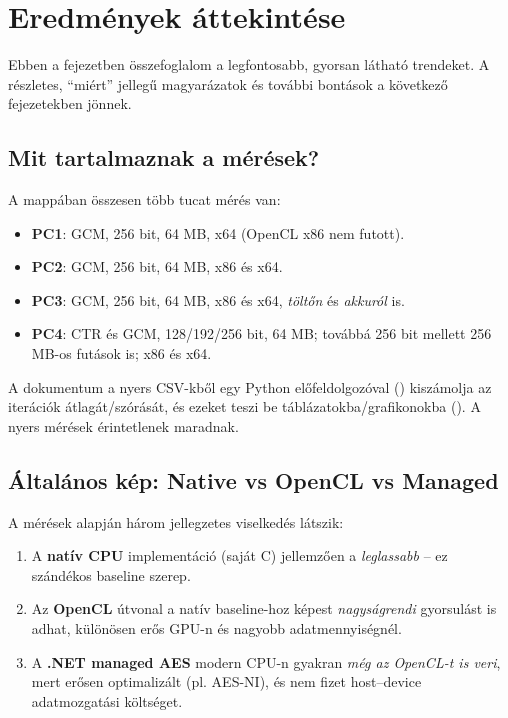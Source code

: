 \chapter{Eredmények áttekintése}

Ebben a fejezetben összefoglalom a legfontosabb, gyorsan látható trendeket.
A részletes, ``miért'' jellegű magyarázatok és további bontások a következő fejezetekben jönnek.

\section{Mit tartalmaznak a mérések?}

A  mappában összesen több tucat mérés van:

\begin{itemize}
  \item \textbf{PC1}: GCM, 256 bit, 64 MB, x64 (OpenCL x86 nem futott).
  \item \textbf{PC2}: GCM, 256 bit, 64 MB, x86 és x64.
  \item \textbf{PC3}: GCM, 256 bit, 64 MB, x86 és x64, \emph{töltőn} és \emph{akkuról} is.
  \item \textbf{PC4}: CTR és GCM, 128/192/256 bit, 64 MB; továbbá 256 bit mellett 256 MB-os futások is; x86 és x64.
\end{itemize}

A dokumentum a nyers CSV-kből egy Python előfeldolgozóval ()
kiszámolja az iterációk átlagát/szórását, és ezeket teszi be táblázatokba/grafikonokba
(). A nyers mérések érintetlenek maradnak.

\section{Általános kép: Native vs OpenCL vs Managed}

A mérések alapján három jellegzetes viselkedés látszik:

\begin{enumerate}
  \item A \textbf{natív CPU} implementáció (saját C) jellemzően a \emph{leglassabb} -- ez szándékos baseline szerep.
  \item Az \textbf{OpenCL} útvonal a natív baseline-hoz képest \emph{nagyságrendi} gyorsulást is adhat,
        különösen erős GPU-n és nagyobb adatmennyiségnél.
  \item A \textbf{.NET managed AES} modern CPU-n gyakran \emph{még az OpenCL-t is veri}, mert
        erősen optimalizált (pl. AES-NI), és nem fizet host--device adatmozgatási költséget.
\end{enumerate}

